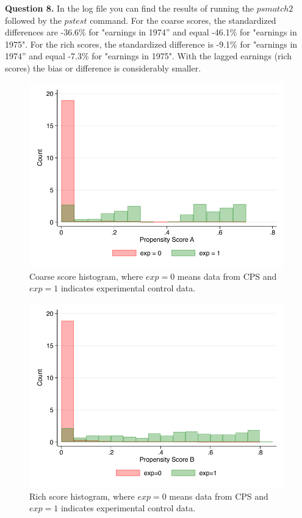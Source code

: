 \documentclass{article}
\theoremstyle{definition}
\begin{document}
\hspace{0.41cm} \textbf{Question 8.} In the log file you can find the results of running the $psmatch2$ followed by the $pstest$ command.  For the coarse scores, the standardized
differences are -36.6\% for "earnings in 1974” and equal -46.1\% for "earnings in 1975". For the rich scores, the standardized
difference is -9.1\% for "earnings in 1974” and equal -7.3\% for "earnings in 1975". With the lagged earnings (rich scores) the bias or difference is considerably smaller. 


 
\begin{figure}[h]
\centering
\includegraphics[width=11cm]{PS2/code/pscorea_hist.pdf}
\caption{Coarse score histogram, where $exp=0$ means data from CPS and $exp=1$ indicates experimental control data.}
\end{figure}

\begin{figure}[h]
\centering
\includegraphics[width=11cm]{PS3/imgs/pscoreb_hist.pdf}
\caption{Rich score histogram, where $exp=0$ means data from CPS and $exp=1$ indicates experimental control data.}
\end{figure}
\end{document}
